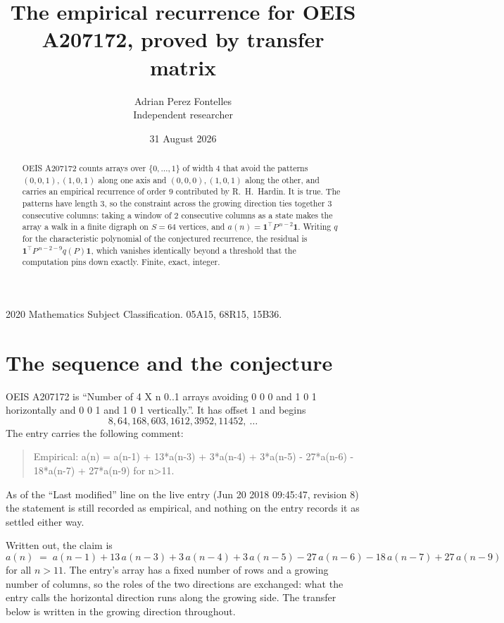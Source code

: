 \documentclass[11pt,a4paper]{article}
\title{The empirical recurrence for OEIS A207172, proved by transfer matrix}
\author{Adrian Perez Fontelles\\ \small Independent researcher}
\date{31 August 2026}
\theoremstyle{plain}
\theoremstyle{definition}
\begin{document}
\maketitle

\begin{abstract}
OEIS A207172 counts arrays over $\{0,\dots,1\}$ of width $4$ that avoid the patterns
$(0,0,1), (1,0,1)$ along one axis and $(0,0,0), (1,0,1)$ along the other, and carries an empirical recurrence of
order $9$ contributed by R.~H.~Hardin. It is true. The patterns have length $3$, so
the constraint across the growing direction ties together $3$ consecutive columns: taking a
window of $2$ consecutive columns as a state makes the array a walk in a finite digraph
on $S=64$ vertices, and $a(n)=\mathbf{1}^{\!\top}P^{\,n-2}\mathbf{1}$. Writing $q$
for the characteristic polynomial of the conjectured recurrence, the residual is
$\mathbf{1}^{\!\top}P^{\,n-2-9}q(P)\mathbf{1}$, which vanishes identically
beyond a threshold that the computation pins down exactly. Finite, exact, integer.
\end{abstract}

\noindent\small 2020 Mathematics Subject Classification. 05A15, 68R15, 15B36.\normalsize

\section{The sequence and the conjecture}

OEIS A207172 is ``Number of 4 X n 0..1 arrays avoiding 0 0 0 and 1 0 1 horizontally and 0 0 1 and 1 0 1 vertically.''. It has offset
$1$ and begins
\[
8, 64, 168, 603, 1612, 3952, 11452,\ \dots
\]
The entry carries the following comment:
\begin{quote}\small
Empirical: a(n) = a(n-1) + 13*a(n-3) + 3*a(n-4) + 3*a(n-5) - 27*a(n-6) - 18*a(n-7) + 27*a(n-9) for n>11.
\end{quote}
As of the ``Last modified'' line on the live entry (Jun 20 2018 09:45:47, revision
8) the statement is still recorded as empirical, and nothing on the entry
records it as settled either way.

Written out, the claim is
\begin{equation}\label{eq:conj}
a(n)\;=\;a(n-1) + 13\,a(n-3) + 3\,a(n-4) + 3\,a(n-5) - 27\,a(n-6) - 18\,a(n-7) + 27\,a(n-9)
\end{equation}
for all $n>11$. The entry's array has a fixed number of rows and a growing number of
columns, so the roles of the two directions are exchanged: what the entry calls the
horizontal direction runs along the growing side. The transfer below is written in the
growing direction throughout.
\end{document}
